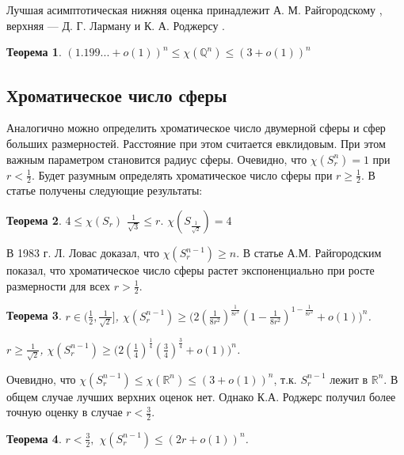 \documentclass[a4paper,12pt]{article}
\newtheorem{theorem}{Теорема}
\begin{document}
 Лучшая асимптотическая нижняя оценка принадлежит А. М. Райгородскому \cite{Rai1}, верхняя — Д. Г. Ларману и К. А. Роджерсу \cite{Larm}. 

\begin{theorem} \label{6}
 $(1.199...+o(1))^n\leq \chi(\mathbb{Q}^n)\leq (3+o(1))^n$
 \end{theorem}
 
 \subsection{Хроматическое число сферы}
 Аналогично можно определить хроматическое число двумерной сферы и сфер больших размерностей. Расстояние при этом считается евклидовым. При этом важным параметром становится радиус сферы.
Очевидно, что $\chi(S_r^n) = 1$ при $r < \frac{1}{2}$.
 Будет разумным определять хроматическое число сферы при $r \geq \frac{1}{2}$. В статье \cite{Simmons} получены следующие результаты:
 
 \begin{theorem} \label{7}
 $4 \leq \chi(S_r)$  $\frac{1}{\sqrt{3}} \leq r.$  $\chi(S_{\frac{1}{\sqrt{2}}}) = 4$
 \end{theorem}
 
 В 1983 г.  Л. Ловас доказал, что  $\chi(S_{r}^{n-1}) \geq n.$ В статье \cite{Rai_sphere} А.М. Райгородским показал, что хроматическое число сферы растет экспоненциально при росте размерности для всех $r > \frac{1}{2}$. 
  
 \begin{theorem} \label{8}
 $r \in (\frac{1}{2}, \frac{1}{\sqrt{2}}]$,  $\chi(S_{r}^{n-1}) \geq \Bigg(2(\frac{1}{8r^2})^{\frac{1}{8r^2}}(1-\frac{1}{8r^2})^{1-\frac{1}{8r^2}}+o(1)\Bigg)^n$.

 $r \geq \frac{1}{\sqrt{2}}$,  $\chi(S_{r}^{n-1}) \geq \Bigg(2(\frac{1}{4})^{\frac{1}{4}}(\frac{3}{4})^{\frac{3}{4}}+o(1)\Bigg)^n$.
 \end{theorem}
 
 Очевидно, что $\chi(S_r^{n-1}) \leq \chi(\mathbb{R}^n) \leq (3+o(1))^n$, т.к. $S_r^{n-1}$ лежит в $\mathbb{R}^n$. В общем случае лучших верхних оценок нет. Однако К.А. Роджерс \cite{Rogers} получил более точную оценку в случае $r < \frac{3}{2}$.
 
 \begin{theorem} \label{9}
 $r  < \frac{3}{2},$  $\chi(S_r^{n-1}) \leq (2r+o(1))^n$.
\end{theorem}
\end{document}
